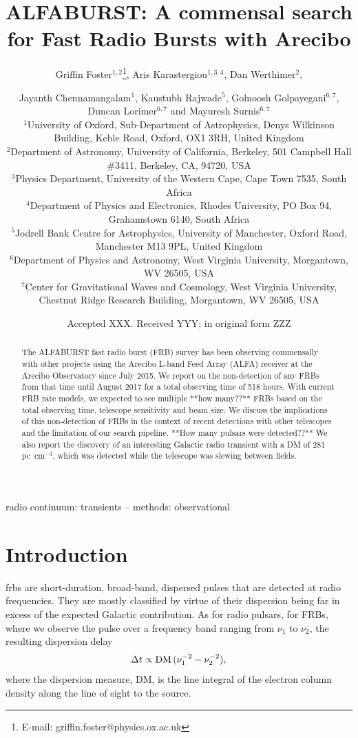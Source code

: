 \documentclass[a4paper,fleqn,usenatbib]{mnras}
\title[The ALFABURST Commensal FRB Survey]{ALFABURST: A commensal search for
Fast Radio Bursts with Arecibo}
\author[G. Foster et al.]{Griffin Foster$^{1,2}$\thanks{E-mail: griffin.foster@physics.ox.ac.uk},
Aris Karastergiou$^{1,3,4}$,
Dan Werthimer$^{2}$,
\and Jayanth Chennamangalam$^{1}$,
Kaustubh Rajwade$^{5}$,
Golnoosh Golpayegani$^{6,7}$,\\
Duncan Lorimer$^{6,7}$
and Mayuresh Surnis$^{6,7}$
\\
$^{1}$University of Oxford, Sub-Department of Astrophysics, Denys Wilkinson Building, Keble Road, Oxford, OX1 3RH, United Kingdom\\
$^{2}$Department of Astronomy, University of California, Berkeley, 501 Campbell Hall \#3411, Berkeley, CA, 94720, USA\\
$^{3}$Physics Department, University of the Western Cape, Cape Town 7535, South Africa\\
$^{4}$Department of Physics and Electronics, Rhodes University, PO Box 94, Grahamstown 6140, South Africa\\
$^{5}$Jodrell Bank Centre for Astrophysics, University of Manchester, Oxford Road, Manchester M13 9PL, United Kingdom\\ 
$^{6}$Department of Physics and Astronomy, West Virginia University, Morgantown, WV 26505, USA\\
$^{7}$Center for Gravitational Waves and Cosmology, West Virginia University, Chestnut Ridge Research Building, Morgantown, WV 26505, USA\\
}
\date{Accepted XXX. Received YYY; in original form ZZZ}
\begin{document}
\label{firstpage}
\pagerange{\pageref{firstpage}--\pageref{lastpage}}
\maketitle

\begin{abstract}
The ALFABURST fast radio burst (FRB) survey has been observing commensally with
other projects using the Arecibo L-band Feed Array (ALFA) receiver at the
Arecibo Observatory since July 2015. We report on the non-detection of any FRBs
from that time until August 2017 for a total observing time of 518 hours.
With current FRB rate models, we expected to see multiple **how many??** FRBs based on the
total observing time, telescope sensitivity and beam size. We discuss the
implications of this non-detection of FRBs in the context of recent detections
with other telescopes and the limitation of our search pipeline. **How many pulsars were
detected??** We also report
the discovery of an interesting Galactic radio transient with a DM of 281 pc~cm$^{-3}$, which was detected while the telescope was slewing between fields.
\end{abstract}

\begin{keywords}
radio continuum: transients -- methods: observational
\end{keywords}


\section{Introduction}
\label{sec:intro}

\glspl{frb} are short-duration, broad-band, dispersed pulses that are detected
at radio frequencies. They are mostly classified by virtue of their dispersion
being far in excess of the expected Galactic contribution. As for radio pulsars,
for FRBs, where we observe the pulse over a frequency band ranging from $\nu_1$ to $\nu_2$,
the resulting dispersion delay 
%
\begin{equation}
\Delta t \propto {\rm DM} \, (\nu_1^{-2} - \nu_2^{-2}),
\end{equation}
%
where the dispersion measure, DM, is the line integral of
the electron column density along the line of sight to the source.
\end{document}
